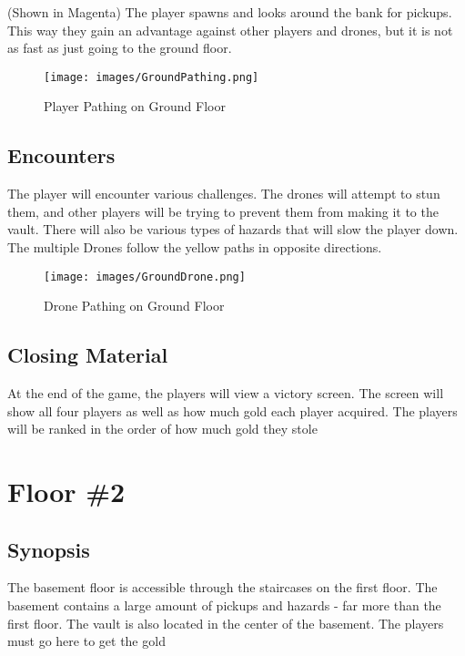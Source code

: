 \documentclass[11pt]{report}
\begin{document}
(Shown in Magenta) The player spawns and looks around the bank for pickups. This way they gain an advantage against other players and drones, but it is not as fast as just going to the ground floor.

\begin{figure}[H]
    \centering
    \texttt{[image: images/GroundPathing.png]}
    \caption{Player Pathing on Ground Floor}
\end{figure}

\subsection{Encounters}

The player will encounter various challenges. The drones will attempt to stun them, and other players will be trying to prevent them from making it to the vault. There will also be various types of hazards that will slow the player down. The multiple Drones follow the yellow paths in opposite directions.

\begin{figure}[H]
    \centering
    \texttt{[image: images/GroundDrone.png]}
    \caption{Drone Pathing on Ground Floor}
\end{figure}

\subsection{Closing Material}

At the end of the game, the players will view a victory screen. The screen will show all four players as well as how much gold each player acquired. The players will be ranked in the order of how much gold they stole

\section{Floor \#2}

\subsection{Synopsis}

The basement floor is accessible through the staircases on the first floor. The basement contains a large amount of pickups and hazards - far more than the first floor. The vault is also located in the center of the basement. The players must go here to get the gold
\end{document}
